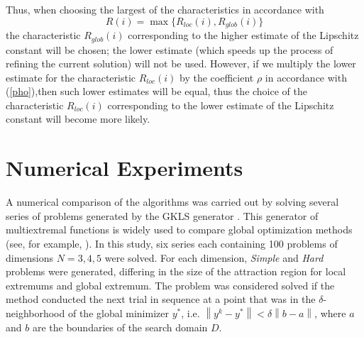 \documentclass[runningheads]{llncs}
\begin{document}
Thus, when choosing the largest of the characteristics in accordance with
\[
R(i) = \max\{R_{loc}(i),R_{glob}(i)\}
\]
the characteristic $R_{glob}(i)$ corresponding to the higher estimate of the Lipschitz constant will be chosen; the lower estimate (which speeds up the process of refining the current solution) will not be used.
However, if we multiply the lower estimate for the characteristic $R_{loc}(i)$ by the coefficient $\rho$ in accordance with (\ref{pho}),then such lower estimates will be equal, 
thus the choice of the characteristic $R_{loc}(i)$ corresponding to the lower estimate of the Lipschitz constant will become more likely.


\section{Numerical Experiments}

A numerical comparison of the algorithms was carried out by solving several series of problems generated by the GKLS generator \cite{Gaviano2003}. This generator of multiextremal functions is widely used to compare global optimization methods (see, for example, \cite{Barkalov2018,Paulavicius2014,Sergeyev2015}). In this study, six series each containing 100 problems of dimensions $N = 3,4,5$ were solved. For each dimension, \textit{Simple} and \textit{Hard} problems were generated, differing in the size of the attraction region for local extremums and global extremum.
The problem was considered solved if the method conducted the next trial in sequence at a point that was in the $\delta$-neighborhood of the global minimizer $y^\ast$, 
i.e. $\left\|y^k-y^\ast\right\| <\delta\left\|b-a\right\|$, where  $a$ and $b$ are the boundaries of the search domain $D$.

\end{document}
